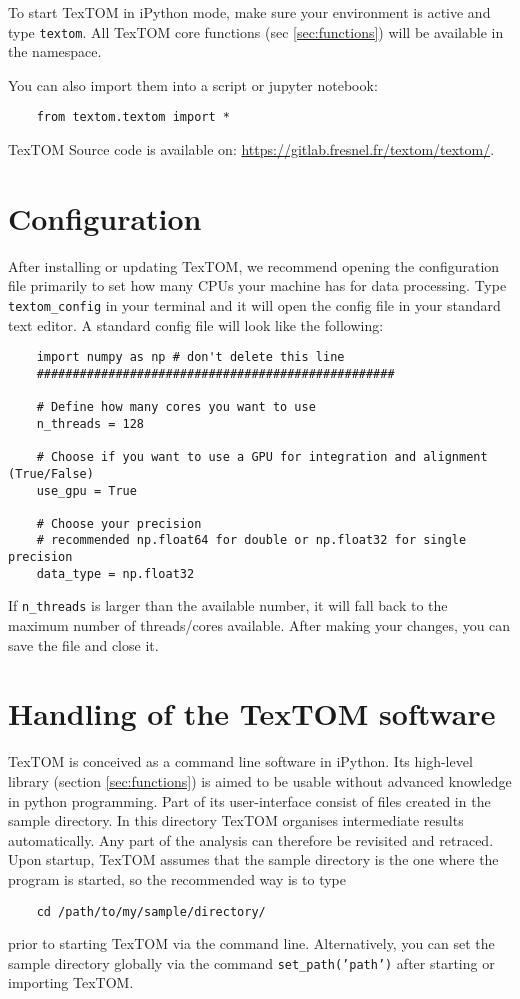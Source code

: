 To start TexTOM in iPython mode, make sure your environment is active and type \texttt{textom}.
All TexTOM core functions (sec \ref{sec:functions}) will be available in the namespace.

You can also import them into a script or jupyter notebook:
\begin{verbatim}
    from textom.textom import *
\end{verbatim}

TexTOM Source code is available on:
\url{https://gitlab.fresnel.fr/textom/textom/}.



\newpage
\section{Configuration}
After installing or updating TexTOM, we recommend opening the configuration file primarily to set how many CPUs your machine has
for data processing. Type \texttt{textom\_config} in your terminal and it will open the config file in your standard
text editor. A standard config file will look like the following:
\begin{verbatim}
    import numpy as np # don't delete this line
    ##################################################
    
    # Define how many cores you want to use 
    n_threads = 128 
    
    # Choose if you want to use a GPU for integration and alignment (True/False)
    use_gpu = True
    
    # Choose your precision
    # recommended np.float64 for double or np.float32 for single precision
    data_type = np.float32
\end{verbatim}
If \texttt{n\_threads} is larger than the available number, it will fall back to the maximum number of threads/cores available.
After making your changes, you can save the file and close it.
\newpage

\section{Handling of the TexTOM software}

TexTOM is conceived as a command line software in iPython.
Its high-level library (section \ref{sec:functions}) is aimed to be usable without
advanced knowledge in python programming.
Part of its user-interface consist of files created in the sample directory. In this directory
TexTOM organises intermediate results automatically. Any part of the analysis can therefore be
revisited and retraced.
Upon startup, TexTOM assumes that the sample directory is the one where the program is started,
so the recommended way is to type
\begin{verbatim}
    cd /path/to/my/sample/directory/
\end{verbatim}
prior to starting TexTOM via the command line.
Alternatively, you can set the sample directory globally via the command \texttt{set\_path('path')} 
after starting or importing TexTOM.

